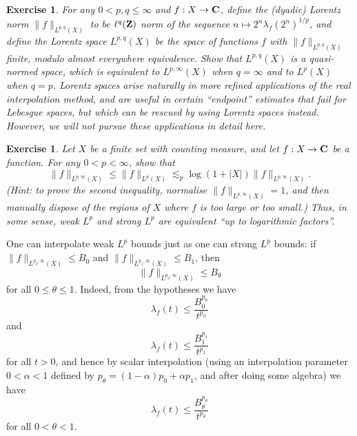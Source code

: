 \documentclass[10pt,reqno]{amsart}
\newtheorem{exercise}[theorem]{Exercise}
\begin{document}
\begin{exercise}
    For any $0 < p,q \leq \infty$ and $f: X \rightarrow {\bf C}$, define the \emph{(dyadic) Lorentz norm} $\|f\|_{L^{p,q}(X)}$ to be $\ell^q({\bf Z})$ norm of the sequence $n \mapsto 2^n \lambda_f(2^n)^{1/p}$, and define the \emph{Lorentz space} $L^{p,q}(X)$ be the space of functions $f$ with $\|f\|_{L^{p,q}(X)}$ finite, modulo almost everywhere equivalence. Show that $L^{p,q}(X)$ is a quasi-normed space, which is equivalent to $L^{p,\infty}(X)$ when $q=\infty$ and to $L^p(X)$ when $q=p$. Lorentz spaces arise naturally in more refined applications of the real interpolation method, and are useful in certain “endpoint” estimates that fail for Lebesgue spaces, but which can be rescued by using Lorentz spaces instead. However, we will not pursue these applications in detail here. 
\end{exercise}

\begin{exercise}
    Let $X$ be a finite set with counting measure, and let $f: X \rightarrow {\bf C}$ be a function. For any $0 < p < \infty$, show that
    \[     \|f\|_{L^{p,\infty}(X)} \leq \|f\|_{L^p(X)} \lesssim_p \log(1+|X|) \|f\|_{L^{p,\infty}(X)}.\]
    (Hint: to prove the second inequality, normalise $\|f\|_{L^{p,\infty}(X)} = 1$, and then manually dispose of the regions of $X$ where $f$ is too large or too small.) Thus, in some sense, weak $L^p$ and strong $L^p$ are equivalent “up to logarithmic factors”. 
\end{exercise}

One can interpolate weak $L^p$ bounds just as one can strong $L^p$ bounds: if $\|f\|_{L^{p_0,\infty}(X)} \leq B_0$ and $\|f\|_{L^{p_1,\infty}(X)} \leq B_1$, then
%
\begin{equation} \|f\|_{L^{p_\theta,\infty}(X)} \leq B_\theta \end{equation}
%
for all $0 \leq \theta \leq 1$. Indeed, from the hypotheses we have
%
\[ \lambda_f(t) \leq \frac{B_0^{p_0}}{t^{p_0}}\]
%
and
%
\[ \lambda_f(t) \leq \frac{B_1^{p_1}}{t^{p_1}}\]
%
for all $t > 0$, and hence by scalar interpolation (using an interpolation parameter $0<\alpha<1$ defined by $p_\theta = (1-\alpha)p_0+\alpha p_1$, and after doing some algebra) we have
%
\begin{equation} \lambda_f(t) \leq \frac{B_\theta^{p_\theta}}{t^{p_\theta}} \end{equation}
%
for all $0 < \theta < 1$.
\end{document}
